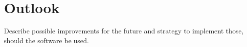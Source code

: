 \chapter{Outlook}
Describe possible improvements for the future and strategy to implement those, should the software be used.